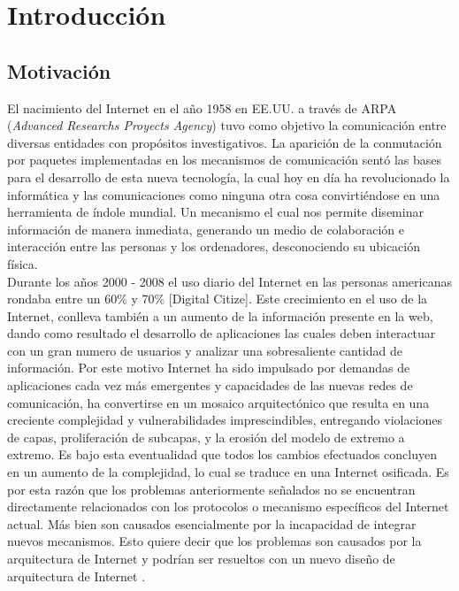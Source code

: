 \documentclass[12pt]{ociamthesis}  %
\begin{document}
\begin{romanpages}          %
\tableofcontents            %
\listoffigures              %
\end{romanpages}            %

\chapter{Introducción}
\section{Motivación}

El nacimiento del Internet en el año 1958 en EE.UU. a través de ARPA (\textit{Advanced Researchs Proyects Agency}) tuvo como objetivo la comunicación entre diversas entidades con propósitos investigativos. La aparición de la conmutación por paquetes implementadas en los mecanismos de comunicación sentó las bases para el desarrollo de esta nueva tecnología, la cual hoy en día ha revolucionado la informática y las comunicaciones como ninguna otra cosa convirtiéndose en una herramienta de índole mundial. Un mecanismo el cual nos permite diseminar información de manera inmediata, generando un medio de colaboración e interacción entre las personas y los ordenadores, desconociendo su ubicación física.\\

Durante los años 2000 - 2008 el uso diario del Internet en las personas americanas rondaba entre un 60\% y 70\% [Digital Citize]. Este crecimiento en el uso de la Internet, conlleva también a un aumento de la información presente en la web, dando como resultado el desarrollo de aplicaciones las cuales deben interactuar con un gran numero de usuarios y analizar una sobresaliente cantidad de información. Por este motivo Internet ha sido impulsado por demandas de aplicaciones cada vez más emergentes y capacidades de las nuevas redes de comunicación, ha convertirse en un mosaico arquitectónico que resulta en una creciente complejidad y vulnerabilidades imprescindibles, entregando violaciones de capas, proliferación de subcapas, y la erosión del modelo de extremo a extremo. Es bajo esta eventualidad que todos los cambios efectuados concluyen en un aumento de la complejidad, lo cual se traduce en una Internet osificada. Es por esta razón que los problemas anteriormente señalados no se encuentran directamente relacionados con los protocolos o mecanismo específicos del Internet actual. Más bien son causados esencialmente por la incapacidad de integrar nuevos mecanismos. Esto quiere decir que los problemas son causados por la arquitectura de Internet y podrían ser resueltos con un nuevo diseño de arquitectura de Internet \cite{muller2009future}.\\
\end{document}

